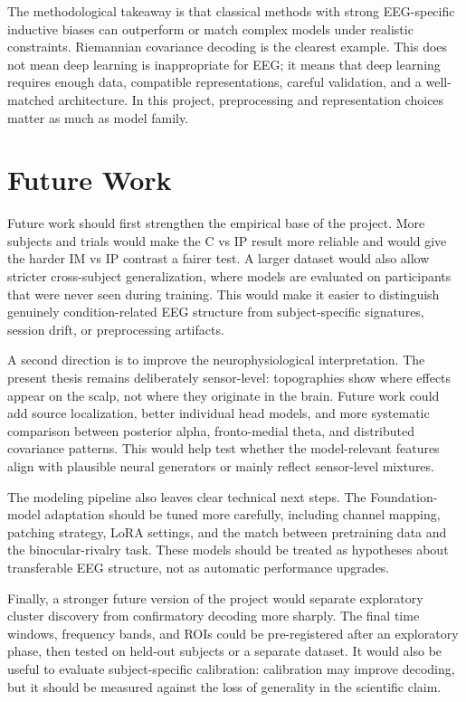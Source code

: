 \documentclass[11pt,a4paper,chapterprefix=false,parskip=false]{scrreprt}
\begin{document}
The methodological takeaway is that classical methods with strong EEG-specific inductive biases can outperform or match complex models under realistic constraints. Riemannian covariance decoding is the clearest example. This does not mean deep learning is inappropriate for EEG; it means that deep learning requires enough data, compatible representations, careful validation, and a well-matched architecture. In this project, preprocessing and representation choices matter as much as model family.

\section{Future Work}
Future work should first strengthen the empirical base of the project. More subjects and trials would make the C vs IP result more reliable and would give the harder IM vs IP contrast a fairer test. A larger dataset would also allow stricter cross-subject generalization, where models are evaluated on participants that were never seen during training. This would make it easier to distinguish genuinely condition-related EEG structure from subject-specific signatures, session drift, or preprocessing artifacts.

A second direction is to improve the neurophysiological interpretation. The present thesis remains deliberately sensor-level: topographies show where effects appear on the scalp, not where they originate in the brain. Future work could add source localization, better individual head models, and more systematic comparison between posterior alpha, fronto-medial theta, and distributed covariance patterns. This would help test whether the model-relevant features align with plausible neural generators or mainly reflect sensor-level mixtures.

The modeling pipeline also leaves clear technical next steps. The Foundation-model adaptation should be tuned more carefully, including channel mapping, patching strategy, LoRA settings, and the match between pretraining data and the binocular-rivalry task. These models should be treated as hypotheses about transferable EEG structure, not as automatic performance upgrades.

Finally, a stronger future version of the project would separate exploratory cluster discovery from confirmatory decoding more sharply. The final time windows, frequency bands, and ROIs could be pre-registered after an exploratory phase, then tested on held-out subjects or a separate dataset. It would also be useful to evaluate subject-specific calibration: calibration may improve decoding, but it should be measured against the loss of generality in the scientific claim.
\end{document}
